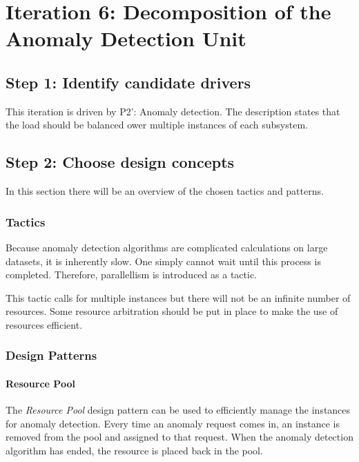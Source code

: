 \section{Iteration 6: Decomposition of the Anomaly Detection Unit}
\label{add:it6}

\subsection{Step 1: Identify candidate drivers}
\label{add:it6/drivers}

\npar This iteration is driven by P2': Anomaly detection. The description states
that the load should be balanced ower multiple instances of each subsystem.

\subsection{Step 2: Choose design concepts}
\label{add:it6/concepts}

\npar In this section there will be an overview of the chosen tactics and
patterns.

\subsubsection{Tactics}
\label{add:it6/tactics}

\npar Because anomaly detection algorithms are complicated calculations on large
datasets, it is inherently slow. One simply cannot wait until this process is
completed. Therefore, parallellism is introduced as a tactic. 

\npar This tactic calls for multiple instances but there will not be an infinite
number of resources. Some resource arbitration should be put in place to make
the use of resources efficient. 

\subsubsection{Design Patterns}
\label{add:it6/patterns}

\paragraph{Resource Pool}

\npar The \emph{Resource Pool} design pattern \citep[see][p.~503]{Buschmann:07}
can be used to efficiently manage the instances for anomaly detection. Every time an
anomaly request comes in, an instance is removed from the pool and assigned to
that request. When the anomaly detection algorithm has ended, the resource is
placed back in the pool. 

